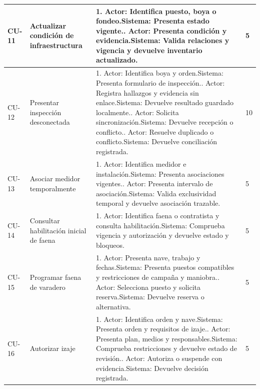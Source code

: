 \begin{longtable}{L{14mm}L{27mm}L{97mm}R{9mm}}
CU-11 & Actualizar condición de infraestructura & 1. Actor: Identifica puesto, boya o fondeo.\newline Sistema: Presenta estado vigente.. Actor: Presenta condición y evidencia.\newline Sistema: Valida relaciones y vigencia y devuelve inventario actualizado. & 5\\\hline
CU-12 & Presentar inspección desconectada & 1. Actor: Identifica boya y orden.\newline Sistema: Presenta formulario de inspección.. Actor: Registra hallazgos y evidencia sin enlace.\newline Sistema: Devuelve resultado guardado localmente.. Actor: Solicita sincronización.\newline Sistema: Devuelve recepción o conflicto.. Actor: Resuelve duplicado o conflicto.\newline Sistema: Devuelve conciliación registrada. & 10\\\hline
CU-13 & Asociar medidor temporalmente & 1. Actor: Identifica medidor e instalación.\newline Sistema: Presenta asociaciones vigentes.. Actor: Presenta intervalo de asociación.\newline Sistema: Valida exclusividad temporal y devuelve asociación trazable. & 5\\\hline
CU-14 & Consultar habilitación inicial de faena & 1. Actor: Identifica faena o contratista y consulta habilitación.\newline Sistema: Comprueba vigencia y autorización y devuelve estado y bloqueos. & 5\\\hline
CU-15 & Programar faena de varadero & 1. Actor: Presenta nave, trabajo y fechas.\newline Sistema: Presenta puestos compatibles y restricciones de campaña y maniobra.. Actor: Selecciona puesto y solicita reserva.\newline Sistema: Devuelve reserva o alternativa. & 5\\\hline
CU-16 & Autorizar izaje & 1. Actor: Identifica orden y nave.\newline Sistema: Presenta orden y requisitos de izaje.. Actor: Presenta plan, medios y responsables.\newline Sistema: Comprueba restricciones y devuelve estado de revisión.. Actor: Autoriza o suspende con evidencia.\newline Sistema: Devuelve decisión registrada. & 5\\\hline

\end{longtable}
